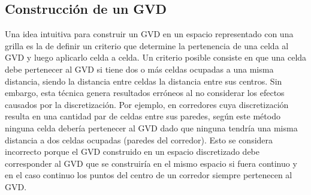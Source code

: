 



\subsection{Construcción de un GVD}\label{subsec:constGVD}

Una idea intuitiva para construir un GVD en un espacio representado con una grilla es la de definir un criterio que determine la pertenencia de una celda al GVD y luego aplicarlo celda a celda. Un criterio posible consiste en que una celda debe pertenecer al GVD si tiene dos o más celdas ocupadas a una misma distancia, siendo la distancia entre celdas la distancia entre sus centros. Sin embargo, esta técnica genera resultados erróneos al no considerar los efectos causados por la discretización. Por ejemplo, en corredores cuya discretización resulta en una cantidad par de celdas entre sus paredes, según este método ninguna celda debería pertenecer al GVD dado que ninguna  tendría una misma distancia a dos celdas ocupadas (paredes del corredor). Esto se considera incorrecto porque el GVD construido en un espacio discretizado debe corresponder al GVD que se construiría en el mismo espacio si fuera continuo y  en el caso continuo los puntos del centro de un corredor siempre pertenecen al GVD. %

